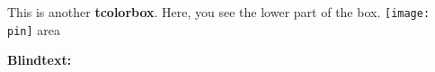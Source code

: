 \documentclass[a4paper]{chirri} %
\newcommand*{\localLocPin}{%
  \texttt{[image: pin]}%
}
\begin{document}
\layout                    %

\begin{headingbox}[skin=standard,sidebyside=false]
This is another \textbf{tcolorbox}.
\tcblower
Here, you see the lower part of the box.
   {\Large{\localLocPin}}{} area
\end{headingbox}

\lipsum[1-3]
\textbf{Blindtext:}
\Blindtext
\end{document}
